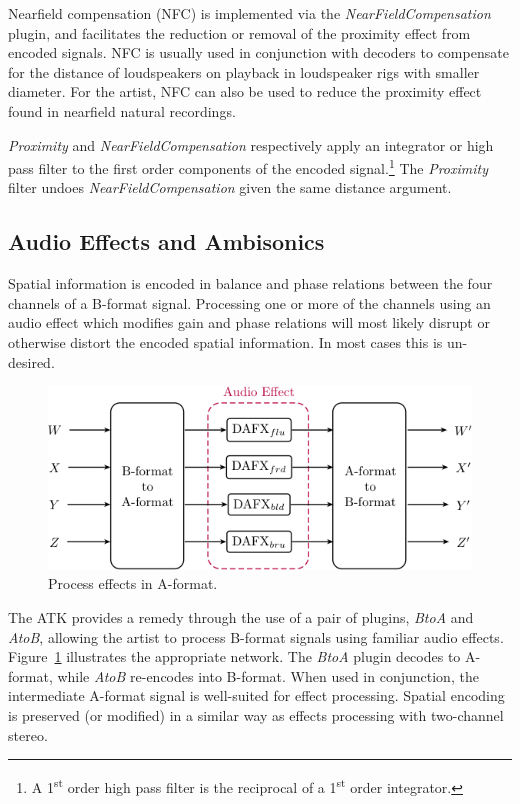 \documentclass{article}
\begin{document}
Near\-field compensation (NFC) is implemented via the \emph{NearFieldCompensation} plugin, and facilitates the reduction or removal of the proximity effect from encoded signals.
NFC is usually used in conjunction with decoders to compensate for the distance of loudspeakers on playback in loudspeaker rigs with smaller diameter. For the artist, NFC can also be used to reduce the proximity effect found in nearfield natural recordings.

\emph{Proximity} and \emph{NearFieldCompensation} respectively apply an integrator or high pass filter to the first order components of the encoded signal.\footnote{A 1\textsuperscript{st} order high pass filter is the reciprocal of a 1\textsuperscript{st} order integrator.} The \emph{Proximity} filter undoes \emph{NearFieldCompensation} given the same distance argument.


\subsection{Audio Effects and Ambisonics}\label{sec:a-format}

Spatial information is encoded in balance and phase relations between the four channels of a B-format signal.
Processing one or more of the channels using an audio effect which modifies gain and phase relations will most likely disrupt or otherwise distort the encoded spatial information. In most cases this is un-desired.

\begin{figure}[h]
\captionsetup{aboveskip=-6pt}
\centering
\includegraphics[width=1.0\columnwidth]{figures/DAFXNetwork.png}
\setlength{\abovecaptionskip}{0pt plus 3pt minus 2pt} %
\caption{Process effects in A-format.\label{fig:aToB}}
\end{figure}

The ATK provides a remedy through the use of a pair of plugins, \emph{BtoA} and \emph{AtoB}, allowing the artist to process B-format signals using familiar audio effects.
Figure~\ref{fig:aToB} illustrates the appropriate network. The \emph{BtoA} plugin decodes to A-format, while \emph{AtoB} re-encodes into B-format.
When used in conjunction, the intermediate A-format signal is well-suited for effect processing. Spatial encoding is preserved (or modified) in a similar way as effects processing with two-channel stereo.
\end{document}
